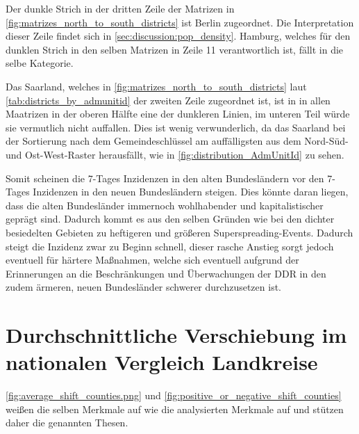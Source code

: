 Der dunkle Strich in der dritten Zeile der Matrizen in \autoref{fig:matrizes_north_to_south_districts} ist Berlin zugeordnet. Die Interpretation dieser Zeile findet sich in \autoref{sec:discussion:pop_density}. Hamburg, welches für den dunklen Strich in den selben Matrizen in Zeile 11 verantwortlich ist, fällt in die selbe Kategorie.

Das Saarland, welches in \autoref{fig:matrizes_north_to_south_districts} laut \autoref{tab:districts_by_admunitid} der zweiten Zeile zugeordnet ist, ist in in allen Maatrizen in der oberen Hälfte eine der dunkleren Linien, im unteren Teil würde sie vermutlich nicht auffallen.
Dies ist wenig verwunderlich, da das Saarland bei der Sortierung nach dem Gemeindeschlüssel am auffälligsten aus dem Nord-Süd- und Ost-West-Raster herausfällt, wie in \autoref{fig:distribution_AdmUnitId} zu sehen.

Somit scheinen die 7-Tages Inzidenzen in den alten Bundesländern vor den 7-Tages Inzidenzen in den neuen Bundesländern steigen. Dies könnte daran liegen, dass die alten Bundesländer immernoch wohlhabender und kapitalistischer geprägt sind. Dadurch kommt es aus den selben Gründen wie bei den dichter besiedelten Gebieten zu heftigeren und größeren Superspreading-Events. Dadurch steigt die Inzidenz zwar zu Beginn schnell, dieser rasche Anstieg sorgt jedoch eventuell für härtere Maßnahmen, welche sich eventuell aufgrund der Erinnerungen an die Beschränkungen und Überwachungen der DDR in den zudem ärmeren, neuen Bundesländer schwerer durchzusetzen ist.


\section{Durchschnittliche Verschiebung im nationalen Vergleich Landkreise}
\autoref{fig:average_shift_counties.png} und
\autoref{fig:positive_or_negative_shift_counties} weißen die selben Merkmale auf wie die analysierten Merkmale auf und stützen daher die genannten Thesen.
